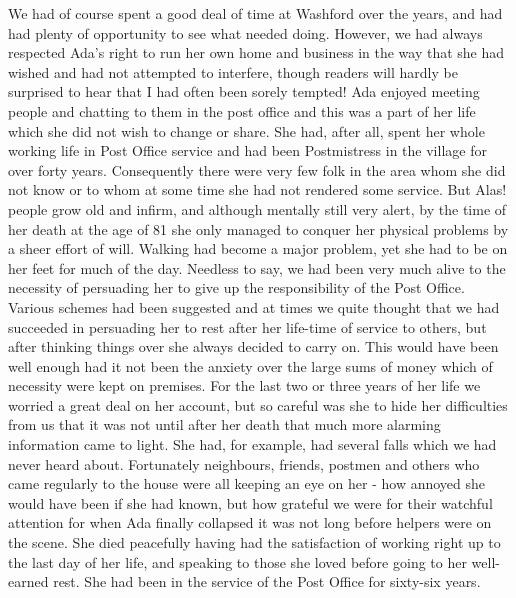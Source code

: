 We had of course spent a good deal of time at Washford over the years, and had had plenty of opportunity to see what needed doing. However, we had always respected Ada's right to run her own home and business in the way that she had wished and had not attempted to interfere, though readers will hardly be surprised to hear that I had often been sorely tempted! Ada enjoyed meeting people and chatting to them in the post office and this was a part of her life which she did not wish to change or share. She had, after all, spent her whole working life in Post Office service and had been Postmistress in the village for over forty years. Consequently there were very few folk in the area whom she did not know or to whom at some time she had not rendered some service. But Alas! people grow old and infirm, and although mentally still very alert, by the time of her death at the age of 81 she only managed to conquer her physical problems by a sheer effort of will. Walking had become a major problem, yet she had to be on her feet for much of the day. Needless to say, we had been very much alive to the necessity of persuading her to give up the responsibility of the Post Office. Various schemes had been suggested and at times we quite thought that we had succeeded in persuading her to rest after her life-time of service to others, but after thinking things over she always decided to carry on. This would have been well enough had it not been the anxiety over the large sums of money which of necessity were kept on premises. For the last two or three years of her life we worried a great deal on her account, but so careful was she to hide her difficulties from us that it was not until after her death that much more alarming information came to light. She had, for example, had several falls which we had never heard about. Fortunately neighbours, friends, postmen and others who came regularly to the house were all keeping an eye on her - how annoyed she would have been if she had known, but how grateful we were for their watchful attention for when Ada finally collapsed it was not long before helpers were on the scene. She died peacefully having had the satisfaction of working right up to the last day of her life, and speaking to those she loved before going to her well-earned rest. She had been in the service of the Post Office for sixty-six years.

